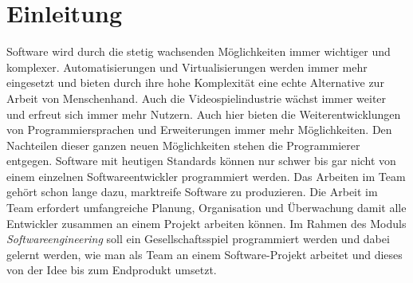 \chapter{Einleitung}
Software wird durch die stetig wachsenden Möglichkeiten immer wichtiger und komplexer. Automatisierungen und Virtualisierungen werden immer mehr eingesetzt und bieten durch ihre hohe Komplexität eine echte Alternative zur Arbeit von Menschenhand. Auch die Videospielindustrie wächst immer weiter und erfreut sich immer mehr Nutzern. Auch hier bieten die Weiterentwicklungen von Programmiersprachen und Erweiterungen immer mehr Möglichkeiten. Den Nachteilen dieser ganzen neuen Möglichkeiten stehen die Programmierer entgegen. Software mit heutigen Standards können nur schwer bis gar nicht von einem einzelnen Softwareentwickler programmiert werden. Das Arbeiten im Team gehört schon lange dazu, marktreife Software zu produzieren. Die Arbeit im Team erfordert umfangreiche Planung, Organisation und Überwachung damit alle Entwickler zusammen an einem Projekt arbeiten können. Im Rahmen des Moduls \textit{Softwareengineering} soll ein Gesellschaftsspiel programmiert werden und dabei gelernt werden, wie man als Team an einem Software-Projekt arbeitet und dieses von der Idee bis zum Endprodukt umsetzt.